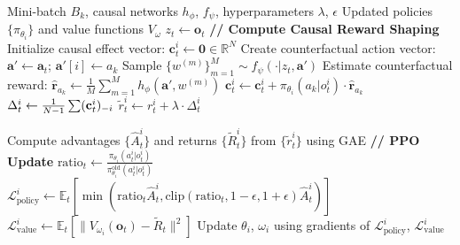 \documentclass{article}
\begin{document}
\begin{algorithm}
\caption{Update Agent Policies with Causal Reward Shaping}
\label{alg:agent-update}
\begin{algorithmic}[1]
\Require Mini-batch $B_k$, causal networks $h_\phi$, $f_\psi$, hyperparameters $\lambda$, $\epsilon$
\Ensure Updated policies $\{\pi_{\theta_i}\}$ and value functions $V_{\omega}$
    \State $z_t \leftarrow \mathbf{o}_t$ 
    \State \textbf{// Compute Causal Reward Shaping}
        \State Initialize causal effect vector: $\mathbf{c}^i_t \leftarrow \mathbf{0} \in \mathbb{R}^N$
            \State Create counterfactual action vector: $\mathbf{a}' \leftarrow \mathbf{a}_t$; $\mathbf{a}'[i] \leftarrow a_k$
            \State Sample $\{w^{(m)}\}_{m=1}^M \sim f_\psi(\cdot | z_t, \mathbf{a}')$
            \State Estimate counterfactual reward: $\mathbf{\hat{r}}_{a_k} \leftarrow \frac{1}{M} \sum_{m=1}^M h_\phi(\mathbf{a}', w^{(m)})$
            \State $\mathbf{c}^i_t \leftarrow \mathbf{c}^i_t + \pi_{\theta_i}(a_k | o^i_t) \cdot \mathbf{\hat{r}}_{a_k}$ 
        \EndFor
        \State $\Delta^i_t \leftarrow {1\over{N-1}}\sum(\mathbf{c}^{i}_t)_{-i}$ 
        \State $\tilde{r}^i_t \leftarrow r^i_t + \lambda \cdot \Delta^i_t$ 
    \EndFor
\EndFor

\State Compute advantages $\{\hat{A}^i_t\}$ and returns $\{\tilde{R}^i_t\}$ from $\{\tilde{r}^i_t\}$ using GAE
\State \textbf{// PPO Update}
    \State $\text{ratio}_t \leftarrow \frac{\pi_{\theta_i}(a^i_t | o^i_t)}{\pi_{\theta_i}^{\text{old}}(a^i_t | o^i_t)}$
    \State $\mathcal{L}^i_{\text{policy}} \leftarrow \mathbb{E}_t[\min(\text{ratio}_t \hat{A}^i_t, \text{clip}(\text{ratio}_t, 1-\epsilon, 1+\epsilon)\hat{A}^i_t)]$
    \State $\mathcal{L}^i_{\text{value}} \leftarrow \mathbb{E}_t[\|V_{\omega_i}(\mathbf{o}_t) - \tilde{R}_t\|^2]$
    \State Update $\theta_i$, $\omega_i$ using gradients of $\mathcal{L}^i_{\text{policy}}$, $\mathcal{L}^i_{\text{value}}$
\EndFor
\end{algorithmic}
\end{algorithm}
\end{document}
